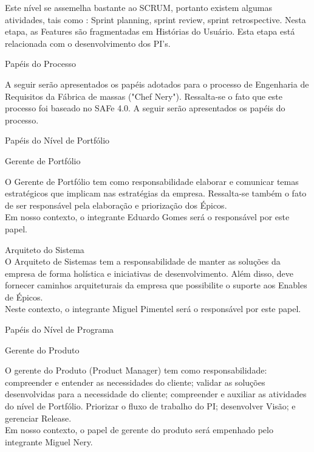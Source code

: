 {{	\tab Este nível se assemelha bastante ao SCRUM,  portanto existem algumas atividades, tais como : Sprint planning, sprint review, sprint retrospective. Nesta etapa, as Features são fragmentadas em Histórias do Usuário. Esta etapa está relacionada com o desenvolvimento dos PI’s. \\
}

{
	\large{Papéis do Processo\\}

	\tab A seguir serão apresentados os papéis adotados para o processo de Engenharia de Requisitos da Fábrica de massas ("Chef Nery"). Ressalta-se o fato que este processo foi baseado no SAFe 4.0. A seguir serão apresentados os papéis do processo.\\

}


{\large{Papéis do Nível de Portfólio\\}}

{
	\large{Gerente de Portfólio\\}

	\tab O Gerente de Portfólio tem como responsabilidade elaborar e comunicar temas estratégicos que implicam nas estratégias da empresa. Ressalta-se também o fato de ser responsável pela elaboração e priorização dos Épicos. \\
	\tab Em nosso contexto, o integrante Eduardo Gomes será o responsável por este papel. \\
}


{
	\large{Arquiteto do Sistema\\}
	\tab O Arquiteto de Sistemas tem a responsabilidade de manter as soluções da empresa de forma holística e iniciativas de desenvolvimento. Além disso, deve fornecer caminhos arquiteturais da empresa que possibilite o suporte aos Enables de Épicos. \\
	\tab Neste contexto, o integrante Miguel Pimentel será o responsável por este papel. \\
}

{\large{Papéis do Nível de Programa\\}}

{
	\large{Gerente do Produto\\}

	\tab O gerente do Produto (Product Manager)  tem como responsabilidade: compreender e entender as necessidades do cliente; validar as soluções desenvolvidas para a necessidade do cliente;  compreender e auxiliar as atividades do nível de Portfólio. Priorizar o fluxo de trabalho do PI; desenvolver Visão; e gerenciar Release. \\
	\tab Em nosso contexto, o papel de gerente do produto será empenhado pelo integrante Miguel Nery. \\
 }


}
